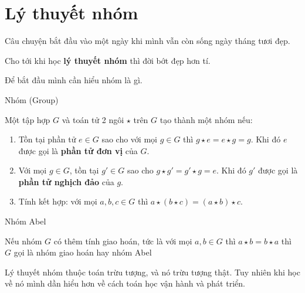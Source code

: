 \section{Lý thuyết nhóm}

Câu chuyện bắt đầu vào một ngày khi mình vẫn còn sống ngày tháng tươi đẹp.

Cho tới khi học \textbf{lý thuyết nhóm} thì đời bớt đẹp hơn tí.

Để bắt đầu mình cần hiểu nhóm là gì.

\begin{defblock}{Nhóm (Group)}

Một tập hợp $G$ và toán tử 2 ngôi $\star$ trên $G$ tạo thành một nhóm nếu:
\begin{enumerate}
    \item Tồn tại phần tử $e \in G$ sao cho với mọi $g \in G$ thì $g \star e = e \star g = g$. Khi đó $e$ được gọi là \textbf{phần tử đơn vị} của $G$.
    \item Với mọi $g \in G$, tồn tại $g' \in G$ sao cho $g \star g' = g' \star g = e$. Khi đó $g'$ được gọi là \textbf{phần tử nghịch đảo} của $g$.
    \item Tính kết hợp: với mọi $a, b, c \in G$ thì $a \star (b \star c) = (a \star b) \star c$.
\end{enumerate}
\end{defblock}

\begin{defblock}{Nhóm Abel}
    
    Nếu nhóm $G$ có thêm tính giao hoán, tức là với mọi $a, b \in G$ thì $a \star b = b \star a$ thì $G$ gọi là nhóm giao hoán hay nhóm Abel
\end{defblock}

Lý thuyết nhóm thuộc toán trừu tượng, và nó trừu tượng thật. Tuy nhiên khi học về nó mình dần hiểu hơn về cách toán học vận hành và phát triển.

\newpage
